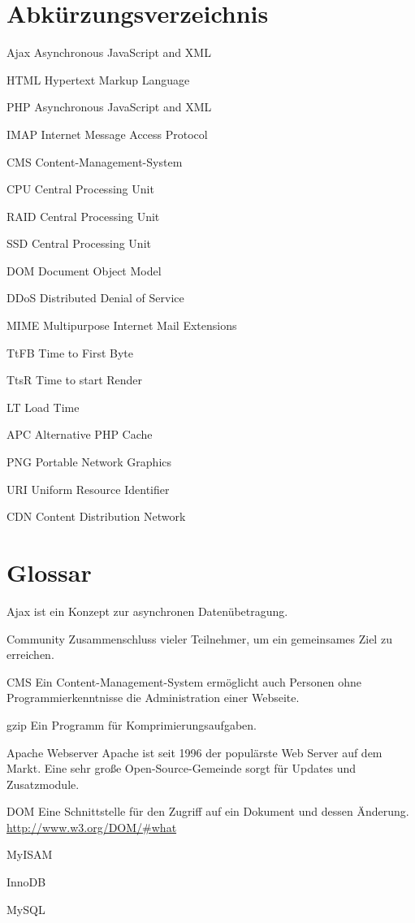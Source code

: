 \section*{Abk\"urzungsverzeichnis}
\begin{basedescript}{\desclabelstyle{\pushlabel}\desclabelwidth{6em}}
  \item[Ajax] Asynchronous JavaScript and XML
  \item[HTML] Hypertext Markup Language
  \item[PHP] Asynchronous JavaScript and XML
  \item[IMAP] Internet Message Access Protocol
  \item[CMS] Content-Management-System
  \item[CPU] Central Processing Unit
  \item[RAID] Central Processing Unit
  \item[SSD] Central Processing Unit
  \item[DOM] Document Object Model
  \item[DDoS] Distributed Denial of Service
  \item[MIME] Multipurpose Internet Mail Extensions
  \item[TtFB] Time to First Byte
  \item[TtsR] Time to start Render
  \item[LT] Load Time
  \item[APC] Alternative PHP Cache
  \item[PNG] Portable Network Graphics
  \item[URI] Uniform Resource Identifier
  \item[CDN] Content Distribution Network
\end{basedescript}
\section*{Glossar}
\begin{basedescript}{\desclabelstyle{\pushlabel}\desclabelwidth{6em}}
  \item[Ajax] ist ein Konzept zur asynchronen Daten\"ubetragung.
  \item[Community] Zusammenschluss vieler Teilnehmer, um ein gemeinsames Ziel zu erreichen.
  \item[CMS] Ein Content-Management-System erm\"oglicht auch Personen ohne Programmierkenntnisse die Administration einer Webseite.
  \item[gzip] Ein Programm f\"ur Komprimierungsaufgaben.
  \item[Apache Webserver] Apache ist seit 1996 der popul\"arste Web Server auf dem Markt. Eine sehr gro\ss{}e Open-Source-Gemeinde sorgt f\"ur Updates und Zusatzmodule.
  \item[DOM] Eine Schnittstelle f\"ur den Zugriff auf ein Dokument und dessen \"Anderung. \url{http://www.w3.org/DOM/\#what}
  \item[MyISAM]
  \item[InnoDB]
  \item[MySQL]
\end{basedescript}
\newpage
